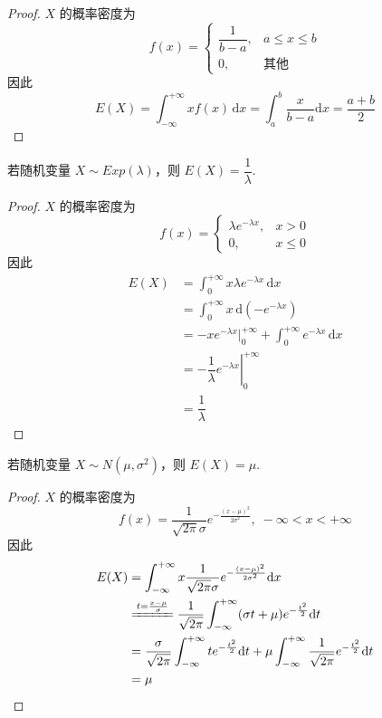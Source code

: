 \begin{proof}
    $X$ 的概率密度为
    $$
    f(x) = \begin{cases}
        \dfrac{1}{b-a}, & a \leqslant x \leqslant b \\[0.5em]
        0, & \text{其他}
    \end{cases}
    $$
    因此
    $$
    E(X) = \int_{-\infty}^{+\infty} x f(x) \, \text{d}x = \int_a^b \dfrac{x}{b-a} \text{d}x = \dfrac{a+b}{2}
    $$
\end{proof}

\begin{conclusion}
    \indent 若随机变量 $X \sim Exp(\lambda)$，则 $E(X) = \dfrac{1}{\lambda}$.
\end{conclusion}

\begin{proof}
    $X$ 的概率密度为
    $$
    f(x) = \begin{cases}
        \lambda e^{-\lambda x}, & x>0 \\
        0, & x \leqslant 0
    \end{cases}
    $$
    因此
    $$
    \begin{aligned}
        E(X) &= \int_0^{+\infty} x \lambda e^{-\lambda x} \, \text{d}x \\
        &= \int_0^{+\infty} x \, \text{d} (-e^{-\lambda x}) \\
        &= -xe^{-\lambda x} \Big|_0^{+\infty} + \int_0^{+\infty} e^{-\lambda x} \, \text{d}x \\
        &= \left. -\dfrac{1}{\lambda} e^{-\lambda x} \right|_0^{+\infty} \\
        &= \dfrac{1}{\lambda}
    \end{aligned}
    $$
\end{proof}

\begin{conclusion}
    \indent 若随机变量 $X \sim N(\mu,\sigma^2)$，则 $E(X) = \mu$.
\end{conclusion}

\begin{proof}
    $X$ 的概率密度为
    $$
    f(x) = \dfrac{1}{\sqrt{2 \pi} \sigma} e^{-\frac{(x-\mu)^2}{2 \sigma^2}}, \; -\infty < x < +\infty
    $$
    因此
    $$
    \begin{aligned}
        E(X) &= \int_{-\infty}^{+\infty} x \dfrac{1}{\sqrt{2 \pi} \sigma} e^{-\frac{(x-\mu)^2}{2 \sigma^2}} \text{d}x \\
        & \xlongequal{t = \frac{x-\mu}{\sigma}} \dfrac{1}{\sqrt{2 \pi}} \int_{-\infty}^{+\infty} (\sigma t + \mu) e^{-\frac{t^2}{2}} \text{d}t \\
        &= \dfrac{\sigma}{\sqrt{2 \pi}} \int_{-\infty}^{+\infty} te^{-\frac{t^2}{2}} \text{d}t + \mu \int_{-\infty}^{+\infty} \dfrac{1}{\sqrt{2 \pi}} e^{-\frac{t^2}{2}} \text{d}t \\
        &= \mu
    \end{aligned}
    $$
\end{proof}

